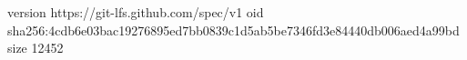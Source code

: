 version https://git-lfs.github.com/spec/v1
oid sha256:4cdb6e03bac19276895ed7bb0839c1d5ab5be7346fd3e84440db006aed4a99bd
size 12452
